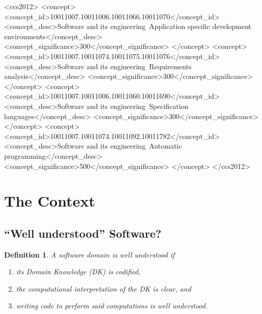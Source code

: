 \documentclass[sigconf,review]{acmart}
\begin{document}
\begin{CCSXML}
<ccs2012>
   <concept>
       <concept_id>10011007.10011006.10011066.10011070</concept_id>
       <concept_desc>Software and its engineering~Application specific development environments</concept_desc>
       <concept_significance>300</concept_significance>
       </concept>
   <concept>
       <concept_id>10011007.10011074.10011075.10011076</concept_id>
       <concept_desc>Software and its engineering~Requirements analysis</concept_desc>
       <concept_significance>300</concept_significance>
       </concept>
   <concept>
       <concept_id>10011007.10011006.10011060.10011690</concept_id>
       <concept_desc>Software and its engineering~Specification languages</concept_desc>
       <concept_significance>300</concept_significance>
       </concept>
   <concept>
       <concept_id>10011007.10011074.10011092.10011782</concept_id>
       <concept_desc>Software and its engineering~Automatic programming</concept_desc>
       <concept_significance>500</concept_significance>
       </concept>
 </ccs2012>
\end{CCSXML}



\newtheorem{defn}{Definition}

\maketitle

\section{The Context}
\subsection{``Well understood'' Software?}\label{ch:wellUnderstood}

\begin{defn}
A software domain is \emph{well understood} if
\begin{enumerate}
\item its Domain Knowledge (DK) is codified,
\item the computational interpretation of the DK is clear, and
\item writing code to perform said computations is well understood.
\end{enumerate}
\end{defn}
\end{document}
